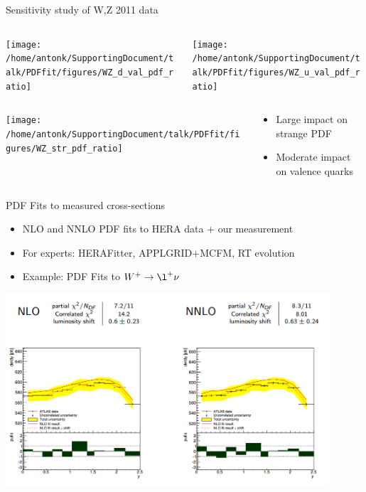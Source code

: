 
\begin{frame}{Sensitivity study of W,Z 2011 data}

\begin{center}
\begin{columns}
\begin{column}{5cm}
 \texttt{[image: /home/antonk/SupportingDocument/talk/PDFfit/figures/WZ\_d\_val\_pdf\_ratio]}
\end{column}
\begin{column}{5cm}
 \texttt{[image: /home/antonk/SupportingDocument/talk/PDFfit/figures/WZ\_u\_val\_pdf\_ratio]}
\end{column}
\end{columns}
\end{center}

\begin{center}
\begin{columns}
\begin{column}{5cm}
 \texttt{[image: /home/antonk/SupportingDocument/talk/PDFfit/figures/WZ\_str\_pdf\_ratio]}
\end{column}
\begin{column}{5cm}
\begin{itemize}
\item{Large impact on strange PDF}
\item{Moderate impact on valence quarks}
\end{itemize}
\end{column}
\end{columns}
\end{center}

\end{frame}


\begin{frame}{PDF Fits to measured cross-sections}
\begin{itemize}
\item{NLO and NNLO PDF fits to HERA data + our measurement}
\item{For experts: HERAFitter, APPLGRID+MCFM, RT evolution }
\item{Example: PDF Fits to $W^+ \rightarrow \l^+ \nu$}
\end{itemize}

\centering
\includegraphics[width=0.9\textwidth]{dates/mtg/figures/wz/pdf_wplus}

\end{frame}

